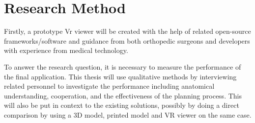 \documentclass[12pt]{scrartcl}
\begin{document}
\section{Research Method}
Firstly, a prototype Vr viewer will be created with the help of related
open-source frameworks/software and guidance from both orthopedic surgeons and
developers with experience from medical technology.

To answer the research question, it is necessary to measure the
performance of the final application. This thesis will use qualitative methods
by interviewing related personnel to investigate the performance including
anatomical understanding, cooperation, and the effectiveness of the planning
process.
This will also be put in context to the existing solutions, possibly
by doing a direct comparison by using a 3D model, printed model and VR viewer
on the same case.
\end{document}
